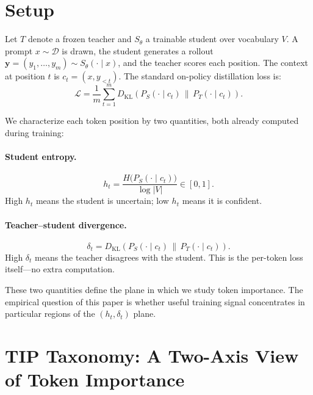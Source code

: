 \documentclass{article}
\newcommand{\KL}{\mathrm{KL}}
\begin{document}
\section{Setup}
\label{sec:prelim}

Let $T$ denote a frozen teacher and $S_\theta$ a trainable student over vocabulary $V$.
A prompt $x \sim \mathcal{D}$ is drawn, the student generates a rollout $\mathbf{y} = (y_1,\ldots,y_m) \sim S_\theta(\cdot \mid x)$, and the teacher scores each position.
The context at position $t$ is $c_t = (x, y_{<t})$.
The standard on-policy distillation loss is:
\begin{equation}
    \mathcal{L} = \frac{1}{m} \sum_{t=1}^{m} D_{\KL}\!\left(P_S(\cdot \mid c_t) \,\|\, P_T(\cdot \mid c_t)\right).
    \label{eq:opd_loss}
\end{equation}

We characterize each token position by two quantities, both already computed during training:

\paragraph{Student entropy.}
\begin{equation}
    h_t = \frac{H\bigl(P_S(\cdot \mid c_t)\bigr)}{\log |V|} \in [0,1].
    \label{eq:entropy}
\end{equation}
High $h_t$ means the student is uncertain; low $h_t$ means it is confident.

\paragraph{Teacher--student divergence.}
\begin{equation}
    \delta_t = D_{\KL}\!\left(P_S(\cdot \mid c_t) \,\|\, P_T(\cdot \mid c_t)\right).
    \label{eq:divergence}
\end{equation}
High $\delta_t$ means the teacher disagrees with the student.
This is the per-token loss itself---no extra computation.

These two quantities define the plane in which we study token importance.
The empirical question of this paper is whether useful training signal concentrates in particular regions of the $(h_t, \delta_t)$ plane.

\section{TIP Taxonomy: A Two-Axis View of Token Importance}
\label{sec:taxonomy}
\end{document}
